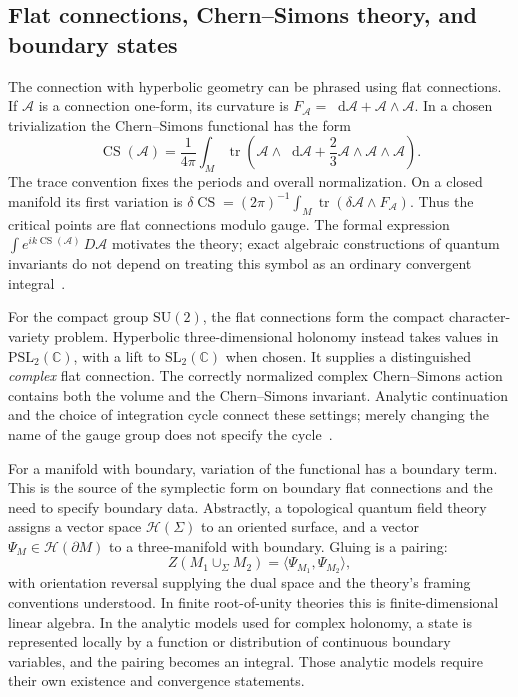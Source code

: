 \documentclass[11pt,a4paper]{article}
\numberwithin{equation}{section}
\theoremstyle{definition}
\theoremstyle{remark}
\DeclareMathOperator{\tr}{tr}
\newcommand{\dd}{\mathop{}\!\mathrm d}
\newcommand{\CC}{\mathbb C}
\begin{document}
\subsection{Flat connections, Chern--Simons theory, and boundary states}
\label{sec:introCS}

The connection with hyperbolic geometry can be phrased using flat
connections. If $\mathscr A$ is a connection one-form, its curvature
is $F_{\mathscr A}=\dd\mathscr A+\mathscr A\wedge\mathscr A$.
In a chosen trivialization the Chern--Simons functional has the form
\begin{equation}
 \operatorname{CS}(\mathscr A)=\frac1{4\pi}\int_M
   \tr\left(\mathscr A\wedge\dd\mathscr A
                    +\frac23\mathscr A\wedge\mathscr A\wedge\mathscr A\right).
 \label{eq:introCSfunctional}
\end{equation}
The trace convention fixes the periods and overall normalization.
On a closed manifold its first variation is
$\delta\operatorname{CS}=(2\pi)^{-1}\int_M
\tr(\delta\mathscr A\wedge F_{\mathscr A})$.
Thus the critical points are flat connections modulo gauge.
The formal expression
$\int e^{ik\operatorname{CS}(\mathscr A)}\,D\mathscr A$
motivates the theory; exact algebraic constructions of quantum
invariants do not depend on treating this symbol as an ordinary
convergent integral~\cite{WittenJones}.

For the compact group $\mathrm{SU}(2)$, the flat connections form
the compact character-variety problem. Hyperbolic three-dimensional
holonomy instead takes values in $\mathrm{PSL}_2(\CC)$, with a lift
to $\mathrm{SL}_2(\CC)$ when chosen. It supplies a distinguished
\emph{complex} flat connection. The correctly normalized complex
Chern--Simons action contains both the volume and the Chern--Simons
invariant. Analytic continuation and the choice of integration
cycle connect these settings; merely changing the name of the
gauge group does not specify the cycle~\cite{GukovApoly,WittenContinuation}.

For a manifold with boundary, variation of the functional has a
boundary term. This is the source of the symplectic form on boundary
flat connections and the need to specify boundary data. Abstractly,
a topological quantum field theory assigns a vector space
$\mathcal H(\Sigma)$ to an oriented surface, and a vector
$\Psi_M\in\mathcal H(\partial M)$ to a three-manifold with boundary.
Gluing is a pairing:
\[
 Z(M_1\cup_\Sigma M_2)=\langle\Psi_{M_1},\Psi_{M_2}\rangle,
\]
with orientation reversal supplying the dual space and the theory's
framing conventions understood. In finite root-of-unity theories
this is finite-dimensional linear algebra. In the analytic models
used for complex holonomy, a state is represented locally by a
function or distribution of continuous boundary variables, and
the pairing becomes an integral. Those analytic models require
their own existence and convergence statements.
\end{document}

